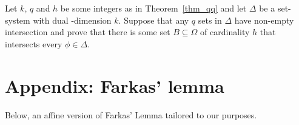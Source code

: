\documentclass[creche.tex]{subfiles}
\begin{document}
% 
% 
% 
% 
% 
% 
% 
% 
% 

\begin{exercise}\label{ex_dual_qqthm}
Let $k$, $q$ and $h$ be some integers as in Theorem~\ref{thm_qq} and let $\Delta$ be a set-system with dual \vc-dimension $k$. Suppose that any $q$ sets in $\Delta$ have non-empty intersection and prove that there is some set $B\subseteq\Omega$ of cardinality $h$ that intersects every $\phi\in\Delta$.\QED
\end{exercise}




\section{Appendix: Farkas' lemma}\label{appendix}

Below, an affine version of Farkas' Lemma tailored to our purposes.
\end{document}
